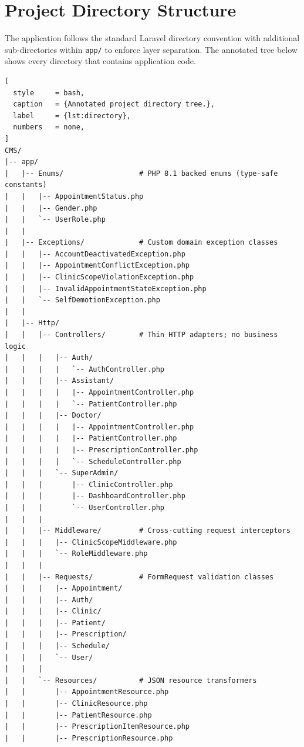 \section{Project Directory Structure}
\label{sec:directory}

The application follows the standard Laravel directory convention with
additional sub-directories within \texttt{app/} to enforce layer
separation. The annotated tree below shows every directory that contains
application code.

\begin{lstlisting}[
  style     = bash,
  caption   = {Annotated project directory tree.},
  label     = {lst:directory},
  numbers   = none,
]
CMS/
|-- app/
|   |-- Enums/                  # PHP 8.1 backed enums (type-safe constants)
|   |   |-- AppointmentStatus.php
|   |   |-- Gender.php
|   |   `-- UserRole.php
|   |
|   |-- Exceptions/             # Custom domain exception classes
|   |   |-- AccountDeactivatedException.php
|   |   |-- AppointmentConflictException.php
|   |   |-- ClinicScopeViolationException.php
|   |   |-- InvalidAppointmentStateException.php
|   |   `-- SelfDemotionException.php
|   |
|   |-- Http/
|   |   |-- Controllers/        # Thin HTTP adapters; no business logic
|   |   |   |-- Auth/
|   |   |   |   `-- AuthController.php
|   |   |   |-- Assistant/
|   |   |   |   |-- AppointmentController.php
|   |   |   |   `-- PatientController.php
|   |   |   |-- Doctor/
|   |   |   |   |-- AppointmentController.php
|   |   |   |   |-- PatientController.php
|   |   |   |   |-- PrescriptionController.php
|   |   |   |   `-- ScheduleController.php
|   |   |   `-- SuperAdmin/
|   |   |       |-- ClinicController.php
|   |   |       |-- DashboardController.php
|   |   |       `-- UserController.php
|   |   |
|   |   |-- Middleware/         # Cross-cutting request interceptors
|   |   |   |-- ClinicScopeMiddleware.php
|   |   |   `-- RoleMiddleware.php
|   |   |
|   |   |-- Requests/           # FormRequest validation classes
|   |   |   |-- Appointment/
|   |   |   |-- Auth/
|   |   |   |-- Clinic/
|   |   |   |-- Patient/
|   |   |   |-- Prescription/
|   |   |   |-- Schedule/
|   |   |   `-- User/
|   |   |
|   |   `-- Resources/          # JSON resource transformers
|   |       |-- AppointmentResource.php
|   |       |-- ClinicResource.php
|   |       |-- PatientResource.php
|   |       |-- PrescriptionItemResource.php
|   |       |-- PrescriptionResource.php

\end{lstlisting}
